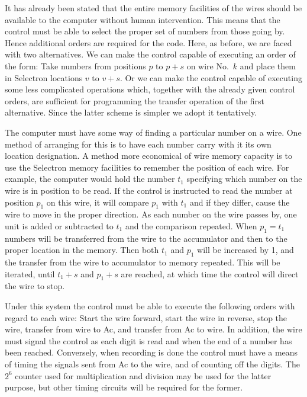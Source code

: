\documentclass[12pt]{amsart}
\begin{document}
It has already been stated that the entire memory facilities of the wires should be available to the computer without human intervention. This means that the control must be able to select the proper set of numbers from those going by. Hence additional orders are required for the code. Here, as before, we are faced with two alternatives. We can make the control capable of executing an order of the form: Take numbers from positions $p$ to $p + s$ on wire No.\ $k$ and place them in Selectron locations $v$ to $v + s$. Or we can make the control capable of executing some less complicated operations which, together with the already given control orders, are sufficient for programming the transfer operation of the first alternative. Since the latter scheme is simpler we adopt it tentatively.

The computer must have some way of finding a particular number on a wire. One method of arranging for this is to have each number carry with it its own location designation. A method more economical of wire memory capacity is to use the Selectron memory facilities to remember the position of each wire. For example, the computer would hold the number $t_1$ specifying which number on the wire is in position to be read. If the control is instructed to read the number at position $p_1$ on this wire, it will compare $p_1$ with $t_1$ and if they differ, cause the wire to move in the proper direction. As each number on the wire passes by, one unit is added or subtracted to $t_1$ and the comparison repeated. When $p_1 = t_1$ numbers will be transferred from the wire to the accumulator and then to the proper location in the memory. Then both $t_1$ and $p_1$ will be increased by 1, and the transfer from the wire to accumulator to memory repeated. This will be iterated, until $t_1 + s$ and $p_1 + s$ are reached, at which time the control will direct the wire to stop.

Under this system the control must be able to execute the following orders with regard to each wire: Start the wire forward, start the wire in reverse, stop the wire, transfer from wire to Ac, and transfer from Ac to wire. In addition, the wire must signal the control as each digit is read and when the end of a number has been reached. Conversely, when recording is done the control must have a means of timing the signals sent from Ac to the wire, and of counting off the digits. The $2^6$ counter used for multiplication and division may be used for the latter purpose, but other timing circuits will be required for the former.
\end{document}

